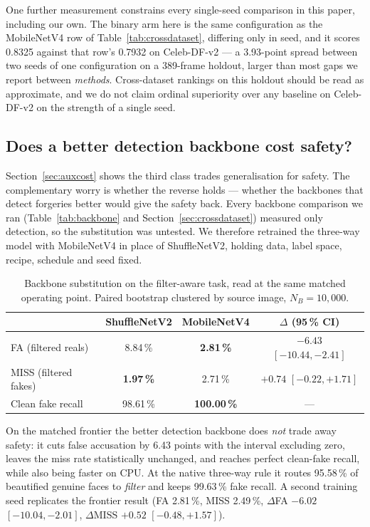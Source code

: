 \documentclass[conference]{IEEEtran}
\begin{document}
One further measurement constrains every single-seed comparison in this paper, including our
own. The binary arm here is the same configuration as the MobileNetV4 row of
Table~\ref{tab:crossdataset}, differing only in seed, and it scores 0.8325 against that row's
0.7932 on Celeb-DF-v2 --- a 3.93-point spread between two seeds of one configuration on a
389-frame holdout, larger than most gaps we report between \emph{methods}. Cross-dataset
rankings on this holdout should be read as approximate, and we do not claim ordinal
superiority over any baseline on Celeb-DF-v2 on the strength of a single seed.

\subsection{Does a better detection backbone cost safety?}
\label{sec:backboneswap}
Section~\ref{sec:auxcost} shows the third class trades generalisation for safety. The
complementary worry is whether the reverse holds --- whether the backbones that detect
forgeries better would give the safety back. Every backbone comparison we ran
(Table~\ref{tab:backbone} and Section~\ref{sec:crossdataset}) measured only detection, so the
substitution was untested. We therefore retrained the three-way model with MobileNetV4 in
place of ShuffleNetV2, holding data, label space, recipe, schedule and seed fixed.

\begin{table}[t]
\caption{Backbone substitution on the filter-aware task, read at the same matched operating
point. Paired bootstrap clustered by source image, $N_B = 10{,}000$.}
\label{tab:backboneswap}
\centering\small
\begin{tabular}{@{}lccc@{}}
\toprule
& ShuffleNetV2 & MobileNetV4 & $\Delta$ (95\,\% CI) \\
\midrule
FA (filtered reals)   & 8.84\,\% & \textbf{2.81\,\%} & $-6.43$ $[-10.44, -2.41]$ \\
MISS (filtered fakes) & \textbf{1.97\,\%} & 2.71\,\% & $+0.74$ $[-0.22, +1.71]$ \\
Clean fake recall     & 98.61\,\% & \textbf{100.00\,\%} & --- \\
\bottomrule
\end{tabular}
\end{table}

On the matched frontier the better detection backbone does \emph{not} trade away safety: it
cuts false accusation by 6.43 points with the interval excluding zero, leaves the miss rate
statistically unchanged, and reaches perfect clean-fake recall, while also being faster on CPU.
At the native three-way rule it routes 95.58\,\% of beautified genuine faces to \emph{filter}
and keeps 99.63\,\% fake recall. A second training seed replicates the frontier result
(FA 2.81\,\%, MISS 2.49\,\%, $\Delta$FA $-6.02$ $[-10.04, -2.01]$, $\Delta$MISS $+0.52$
$[-0.48, +1.57]$).
\end{document}
